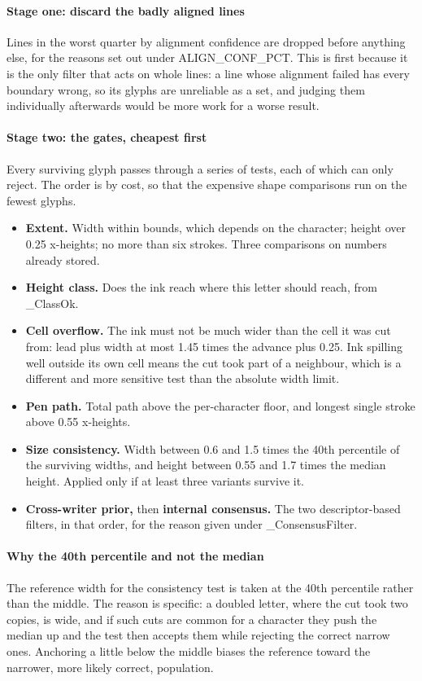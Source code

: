\paragraph{Stage one: discard the badly aligned lines}
Lines in the worst quarter by alignment confidence are dropped before anything else, for the reasons set out under ALIGN\_CONF\_PCT. This is first because it is the only filter that acts on whole lines: a line whose alignment failed has every boundary wrong, so its glyphs are unreliable as a set, and judging them individually afterwards would be more work for a worse result.


\paragraph{Stage two: the gates, cheapest first}
Every surviving glyph passes through a series of tests, each of which can only reject. The order is by cost, so that the expensive shape comparisons run on the fewest glyphs.


\begin{itemize}\setlength\itemsep{0pt}
  \item \textbf{Extent.} Width within bounds, which depends on the character; height over 0.25 x-heights; no more than six strokes. Three comparisons on numbers already stored.
  \item \textbf{Height class.} Does the ink reach where this letter should reach, from \_ClassOk.
  \item \textbf{Cell overflow.} The ink must not be much wider than the cell it was cut from: lead plus width at most 1.45 times the advance plus 0.25. Ink spilling well outside its own cell means the cut took part of a neighbour, which is a different and more sensitive test than the absolute width limit.
  \item \textbf{Pen path.} Total path above the per-character floor, and longest single stroke above 0.55 x-heights.
  \item \textbf{Size consistency.} Width between 0.6 and 1.5 times the 40th percentile of the surviving widths, and height between 0.55 and 1.7 times the median height. Applied only if at least three variants survive it.
  \item \textbf{Cross-writer prior,} then \textbf{internal consensus.} The two descriptor-based filters, in that order, for the reason given under \_ConsensusFilter.
\end{itemize}

\paragraph{Why the 40th percentile and not the median}
The reference width for the consistency test is taken at the 40th percentile rather than the middle. The reason is specific: a doubled letter, where the cut took two copies, is wide, and if such cuts are common for a character they push the median up and the test then accepts them while rejecting the correct narrow ones. Anchoring a little below the middle biases the reference toward the narrower, more likely correct, population.


